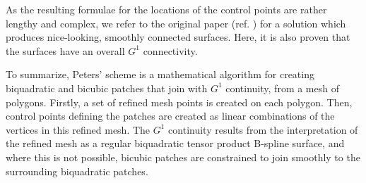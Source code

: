 As the resulting formulae for the locations of the \Bez control points are rather lengthy and complex, we refer to the original paper (ref. \cite{peters1992constructing}) for a solution which produces nice-looking, smoothly connected surfaces. Here, it is also proven that the surfaces have an overall $G^1$ connectivity.

To summarize, Peters' scheme is a mathematical algorithm for creating biquadratic and bicubic \Bez patches that join with $G^1$ continuity, from a mesh of polygons. Firstly, a set of refined mesh points is created on each polygon. Then, \Bez control points defining the patches are created as linear combinations of the vertices in this refined mesh. The $G^1$ continuity results from the interpretation of the refined mesh as a regular biquadratic tensor product B-spline surface, and where this is not possible, bicubic \Bez patches are constrained to join smoothly to the surrounding biquadratic patches.

%


%
